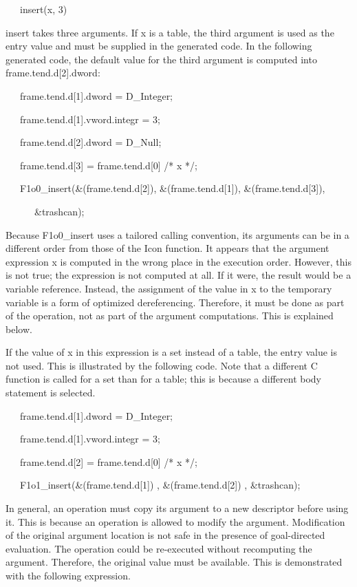 {\ttfamily\mdseries
\ \ \ insert(x, 3)}

\noindent insert takes three arguments. If x is a table, the third
argument is used as the entry value and must be supplied in the
generated code. In the following generated code, the default value for
the third argument is computed into frame.tend.d[2].dword:

{\ttfamily\mdseries
\ \ \ frame.tend.d[1].dword = D\_Integer;}

{\ttfamily\mdseries
\ \ \ frame.tend.d[1].vword.integr = 3;}

{\ttfamily\mdseries
\ \ \ frame.tend.d[2].dword = D\_Null;}

{\ttfamily\mdseries
\ \ \ frame.tend.d[3] = frame.tend.d[0] /* x */;}

{\ttfamily\mdseries
\ \ \ F1o0\_insert(\&(frame.tend.d[2]), \&(frame.tend.d[1]), \&(frame.tend.d[3]),}

{\ttfamily\mdseries
\ \ \ \ \ \ \&trashcan);}


Because F1o0\_insert uses a tailored calling convention, its arguments
can be in a different order from those of the Icon function. It
appears that the argument expression x is computed in the wrong place
in the execution order.  However, this is not true; the expression is
not computed at all. If it were, the result would be a variable
reference.  Instead, the assignment of the value in x to the temporary
variable is a form of optimized dereferencing. Therefore, it must be
done as part of the operation, not as part of the argument
computations. This is explained below.

If the value of x in this expression is a set instead of a table, the
entry value is not used. This is illustrated by the following
code. Note that a different C function is called for a set than for a
table; this is because a different body statement is selected.

{\ttfamily\mdseries
\ \ \ frame.tend.d[1].dword = D\_Integer;}

{\ttfamily\mdseries
\ \ \ frame.tend.d[1].vword.integr = 3;}

{\ttfamily\mdseries
\ \ \ frame.tend.d[2] = frame.tend.d[0] /* x */;}

{\ttfamily\mdseries
\ \ \ F1o1\_insert(\&(frame.tend.d[1]) , \&(frame.tend.d[2]) , \&trashcan);}


In general, an operation must copy its argument to a new descriptor
before using it. This is because an operation is allowed to modify the
argument. Modification of the original argument location is not safe
in the presence of goal-directed evaluation. The operation could be
re-executed without recomputing the argument. Therefore, the original
value must be available. This is demonstrated with the following
expression.

